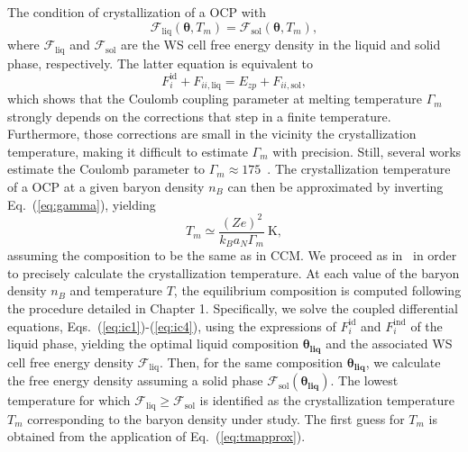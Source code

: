 The condition of crystallization of a OCP with 
%
\begin{equation}
  \mathcal{F}_{\text{liq}}(\bm{\theta}, T_m) 
  = \mathcal{F}_{\text{sol}}(\bm{\theta}, T_m),\label{eq:tmocp}
\end{equation}
%
where $\mathcal{F}_\text{liq}$ and $\mathcal{F}_\text{sol}$ are the WS cell
free energy density in the liquid and solid phase, respectively.
The latter equation is equivalent to
%
\begin{equation}
  F_i^{\text{id}} + F_{ii,\text{liq}} = E_{zp} + F_{ii,\text{sol}},
\end{equation}
%
which shows that the Coulomb coupling parameter at melting
temperature $\Gamma_m$ strongly depends on the corrections that step in a
finite temperature. Furthermore, those corrections are small in the vicinity
the crystallization temperature, making it difficult to estimate $\Gamma_m$
with precision. Still, several works estimate the Coulomb parameter to 
$\Gamma_m \approx 175$~\cite{VanHorn1969,Haensel2007}. 
The crystallization temperature of a OCP at a given baryon density $n_B$ 
can then be approximated by inverting Eq.~(\ref{eq:gamma}), yielding
%
\begin{equation}
  T_m \simeq \frac{(Ze)^2}{k_B a_N \Gamma_m} \ \text{K},\label{eq:tmapprox}
\end{equation}
%
assuming the composition to be the same as in CCM. 
%
We proceed as in~\cite{Fantina2020} in order to precisely calculate the 
crystallization temperature. At each value of the baryon density $n_B$ and 
temperature $T$, the equilibrium composition is computed following the 
procedure detailed in Chapter 1. Specifically, we solve the coupled 
differential equations, Eqs.~(\ref{eq:ic1})-(\ref{eq:ic4}), using the 
expressions of $F_{i}^{\text{id}}$ and $F_{i}^{\text{ind}}$ of the liquid 
phase, yielding the optimal liquid composition $\bm{\theta_{\text{liq}}}$ and 
the associated WS cell free energy density $\mathcal{F}_{\text{liq}}$. Then, 
for the same composition $\bm{\theta_{\text{liq}}}$, we calculate the free 
energy density assuming a solid phase 
$\mathcal{F}_{\text{sol}}(\bm{\theta_{\text{liq}}})$. The lowest temperature 
for which $\mathcal{F}_{\text{liq}} \geq \mathcal{F}_{\text{sol}}$ is 
identified as the crystallization temperature $T_m$ corresponding to the 
baryon density under study. The first guess for $T_m$ is obtained from the
application of Eq.~(\ref{eq:tmapprox}).

